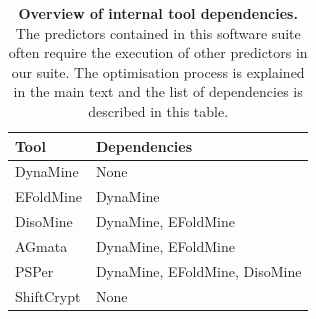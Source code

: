 \begin{table}[ht]
\centering
\small
\caption{\textbf{Overview of internal tool dependencies.} The predictors contained in this software suite often require the execution of other predictors in our suite. The optimisation process is explained in the main text and the list of dependencies is described in this table. }
\label{tab:tool_dependencies}
\begin{tabular}{ll}
\toprule
\textbf{Tool} & \textbf{Dependencies} \\ \midrule
DynaMine & None \\ %
EFoldMine & DynaMine \\ %
DisoMine & DynaMine, EFoldMine \\ %
AGmata & DynaMine, EFoldMine \\ %
PSPer & DynaMine, EFoldMine, DisoMine\\ %
ShiftCrypt & None \\ \bottomrule
\end{tabular}
\end{table}

